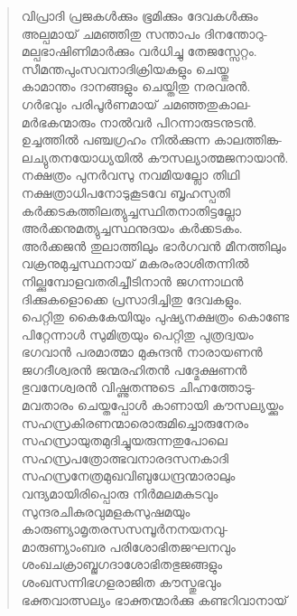 \begin{verse}
വിപ്രാദി പ്രജകള്‍ക്കും ഭൂമിക്കും ദേവകള്‍ക്കും\\
അല്പമായ് ചമഞ്ഞിതു സന്താപം ദിനന്തോറു-\\
മല്പഭാഷിണിമാര്‍ക്കും വര്‍ധിച്ചു തേജസ്സേറ്റം.\\
സീമന്തപുംസവനാദിക്രിയകളും ചെയ്തു\\
കാമാന്തം ദാനങ്ങളും ചെയ്തിതു നരവരന്‍.\\
ഗര്‍ഭവും പരിപൂര്‍ണമായ് ചമഞ്ഞതുകാല-\\
മര്‍ഭകന്മാരും നാല്‍വര്‍ പിറന്നാരുടനുടന്‍.\\
ഉച്ചത്തില്‍ പഞ്ചഗ്രഹം നില്‍ക്കുന്ന കാലത്തിങ്ക-\\
ലച്യുതനയോധ്യയില്‍ കൗസല്യാത്മജനായാന്‍.\\
നക്ഷത്രം പുനര്‍വസു നവമിയല്ലോ തിഥി\\
നക്ഷത്രാധിപനോടുകൂടവേ ബൃഹസ്പതി\\
കര്‍ക്കടകത്തിലത്യുച്ചസ്ഥിതനാതിട്ടല്ലോ\\
അര്‍ക്കനുമത്യുച്ചസ്ഥനുദയം കര്‍ക്കടകം.\\
അര്‍ക്കജന്‍ തുലാത്തിലും ഭാര്‍ഗവന്‍ മീനത്തിലും\\
വക്രനുമുച്ചസ്ഥനായ് മകരംരാശിതന്നില്‍\\
നില്ക്കുമ്പോളവതരിച്ചീടിനാന്‍ ജഗന്നാഥന്‍\\
ദിക്കുകളൊക്കെ പ്രസാദിച്ചിതു ദേവകളും.\\
പെറ്റിതു കൈകേയിയും പുഷ്യനക്ഷത്രം കൊണ്ടേ\\
പിറ്റേന്നാള്‍ സുമിത്രയും പെറ്റിതു പുത്രദ്വയം\\
ഭഗവാന്‍ പരമാത്മാ മുകുന്ദന്‍ നാരായണന്‍\\
ജഗദീശ്വരന്‍ ജന്മരഹിതന്‍ പദ്മേക്ഷണന്‍\\
ഭുവനേശ്വരന്‍ വിഷ്ണുതന്നുടെ ചിഹ്നത്തോടു-\\
മവതാരം ചെയ്തപ്പോള്‍ കാണായി കൗസല്യയ്ക്കും\\
സഹസ്രകിരണന്മാരൊരുമിച്ചൊരുനേരം\\
സഹസ്രായുതമുദിച്ചുയരുന്നതുപോലെ\\
സഹസ്രപത്രോത്ഭവനാരദസനകാദി\\
സഹസ്രനേത്രമുഖവിബുധേന്ദ്രന്മാരാലും\\
വന്ദ്യമായിരിപ്പൊരു നിര്‍മലമകുടവും\\
സുന്ദരചികുരവുമളകസുഷമയും\\
കാരുണ്യാമൃതരസസമ്പൂര്‍നനയനവു-\\
മാരുണ്യാംബര പരിശോഭിതജഘനവും\\
ശംഖചക്രാബ്ജഗദാശോഭിതഭുജങ്ങളും\\
ശംഖസന്നിഭഗളരാജിത കൗസ്തുഭവും\\
ഭക്തവാത്സല്യം ഭാക്തന്മാര്‍ക്കു കണ്ടറിവാനായ്\\

\end{verse}
